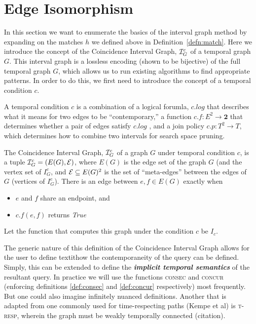 \section{Edge Isomorphism}

In this section we want to enumerate the basics of the interval graph
method by expanding on the matches $h$ we defined above in
Definition~\ref{defn:match}. Here we introduce the concept of the
Coincidence Interval Graph, $\mathcal{I}_G^c$ of a temporal graph $G$. This
interval graph is a lossless encoding (shown to be bijective) of the
full temporal graph $G$, which allows us to run existing algorithms to
find appropriate patterns. In order to do this, we first need to
introduce the concept of a temporal condition $c$.

\begin{defn}
  A temporal condition $c$ is a combination of a logical forumla, $c.log$ that
  describes what it means for two edges to be ``contemporary,'' a function $c.f
  : E^2 \to \textbf{2}$ that determines whether a pair of edges satisfy $c.log$
  , and a join policy $c.p: T^2 \to T$, which determines how to combine two
  intervals for search space pruning.
\end{defn}

\begin{defn}
  The Coincidence Interval Graph, $\mathcal{I}_G^c$ of a graph $G$ under
  temporal condition $c$, is a tuple $\mathcal{I}_G^c = (E(G), \mathcal{E})$, where
  $E(G)$ is the edge set of the graph $G$ (and the vertex set of
  $I_G^c$, and $\mathcal{E} \subseteq E(G)^2$ is the set of ``meta-edges'' between the edges of
  $G$ (vertices of $I_G^c$). There is an edge between $e,f \in E(G)$
  exactly when
  \begin{itemize}
    \item $e$ and $f$ share an endpoint, and
    \item $c.f(e,f)$ returns \emph{True}
  \end{itemize}

  Let the function that computes this graph under the condition $c$ be $I_c$.
\end{defn}

The generic nature of this definition of the Coincidence Interval Graph allows
for the user to define textit{how} the contemporaneity of the query can be
defined. Simply, this can be extended to define the \textit{\bf implicit
  temporal semantics} of the resultant query. In practice we will use the
functions \textsc{consec} and \textsc{concur} (enforcing definitions
\ref{def:consec} and \ref{def:concur} respectively) most frequently. But one
could also imagine infinitely nuanced definitions. Another that is adapted from
one commonly used for time-respecting paths (Kempe et al) is \textsc{t-resp},
wherein the graph must be weakly temporally connected (citation). 

